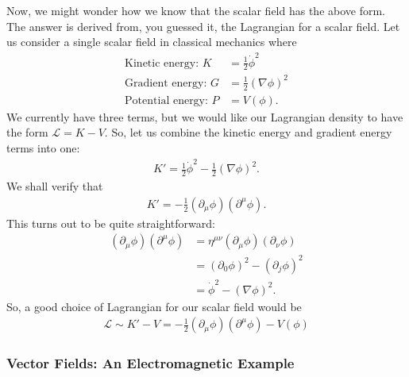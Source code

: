 \documentclass[a4paper,11pt]{article}
\numberwithin{equation}{section}
\theoremstyle{definition}
\begin{document}
Now, we might wonder how we know that the scalar field has the above form. The answer is derived from, you guessed it, the Lagrangian for a scalar field. Let us consider a single scalar field in classical mechanics where
\begin{align*}
\text{Kinetic energy: } K &= \frac{1}{2}\dot{\phi}^2\\
\text{Gradient energy: } G &= \frac{1}{2}\left(\nabla \phi \right)^2\\
\text{Potential energy: } P &= V(\phi).
\end{align*}
We currently have three terms, but we would like our Lagrangian density to have the form $\mathcal{L} = K-V$. So, let us combine the kinetic energy and gradient energy terms into one:
\begin{align*}
K' = \frac{1}{2}\dot{\phi}^2 - \frac{1}{2}\left(\nabla \phi \right)^2.
\end{align*}
We shall verify that 
\begin{align*}
K' = -\frac{1}{2}\left( \partial_\mu \phi\right)\left( \partial^\mu \phi\right).
\end{align*}
This turns out to be quite straightforward:
\begin{align*}
\left( \partial_\mu \phi\right)\left( \partial^\mu \phi\right) &= \eta^{\mu\nu}\left( \partial_\mu \phi\right)\left( \partial_\nu \phi\right)\\
&= \left( \partial_0 \phi \right)^2 - \left(\partial_j\phi \right)^2\\
&= \dot{\phi}^2 - \left( \nabla \phi \right)^2.
\end{align*}
So, a good choice of Lagrangian for our scalar field would be
\begin{align*}
\mathcal{L} \sim K'-V = -\frac{1}{2}\left( \partial_\mu \phi\right)\left( \partial^\mu \phi\right) - V(\phi)
\end{align*}


\subsubsection{Vector Fields: An Electromagnetic Example}




\newpage
\end{document}
